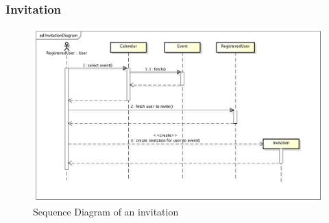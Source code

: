 \subsubsection{Invitation}
\begin{center}
 \begin{figure}[H]
    \includegraphics[width=1\textwidth,height=1\textwidth]{../UMLDiagram/sequence/InvitationDiagram/InvitationDiagram.png}
    \caption{Sequence Diagram of an invitation}
     \label{fig:invitseqdiag}
     \end{figure}
   \end{center}  
